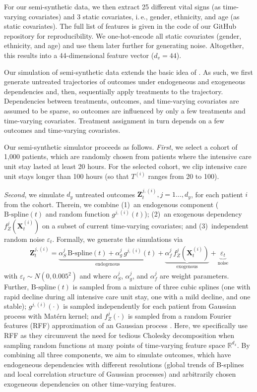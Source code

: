 \documentclass{article}
\newcommand\ie{i.\,e.\xspace}
\theoremstyle{plain}
\theoremstyle{definition}
\theoremstyle{remark}
\begin{document}
For our semi-synthetic data, we then extract 25 different vital signs (as time-varying covariates) and 3 static covariates, \ie, gender, ethnicity, and age (as static covariates). The full list of features is given in the code of our GitHub repository for reproducibility. We one-hot-encode all static covariates (gender, ethnicity, and age) and use them later further for generating noise. Altogether, this results into a 44-dimensional feature vector ($d_v = 44$).

Our simulation of semi-synthetic data extends the basic idea of \cite{schulam2017reliable}. As such, we first generate untreated trajectories of outcomes under endogeneous and exogeneous dependencies and, then, sequentially apply treatments to the trajectory. Dependencies between treatments, outcomes, and time-varying covariates are assumed to be sparse, so outcomes are influenced by only a few treatments and time-varying covariates. Treatment assignment in turn depends on a few outcomes and time-varying covariates. 

Our semi-synthetic simulator proceeds as follows. \emph{First}, we select a cohort of 1,000 patients, which are randomly chosen from patients where the intensive care unit stay lasted at least 20 hours. For the selected cohort, we clip intensive care unit stays longer than 100 hours (so that $T^{(i)}$ ranges from 20 to 100). 

\emph{Second}, we simulate $d_{y}$ untreated outcomes $\mathbf{Z}_{t}^{j, (i)}, j = 1 \dots, d_{y}$, for each patient $i$ from the cohort. Therein, we combine (1)~an endogenous component ($\text{B-spline}(t)$ and random function $g^{j, (i)}(t)$); (2)~an exogenous dependency $f_Z^j(\mathbf{X}_{t}^{(i)})$ on a subset of current time-varying covariates; and (3)~independent random noise $\varepsilon_t$. Formally, we generate the simulations via
\begin{align}
    \mathbf{Z}_{t}^{j, (i)} = \underbrace{\alpha_S^j \, \text{B-spline}(t) + \alpha_g^j \, g^{j, (i)}(t)}_\text{endogenous} +  \underbrace{\alpha_f^j \, f_Z^j(\mathbf{X}_{t}^{(i)})}_{\text{exogenous}} + \underbrace{\varepsilon_t}_{\text{noise}} 
\end{align}
with $\varepsilon_t \sim N(0, 0.005^2)$ and where $\alpha_S^j$, $\alpha_g^j$, and $\alpha_f^j$ are weight parameters. Further, $\text{B-spline}(t)$ is sampled from a mixture of three cubic splines (one with rapid decline during all intensive care unit stay, one with a mild decline, and one stable); $g^{j, (i)}(\cdot)$ is sampled independently for each patient from Gaussian process with Matérn kernel; and $f_Z^j(\cdot)$ is sampled from a random Fourier features (RFF) approximation of an Gaussian process \cite{hensman2017variational}. Here, we specifically use RFF as they circumvent the need for tedious Cholesky decomposition when sampling random functions at many points of time-varying feature space $\mathbb{R}^{d_x}$. By combining all three components, we aim to simulate outcomes, which have endogeneous dependencies with different resolutions (global trends of B-splines and local correlation structure of Gaussian processes) and arbitrarily chosen exogeneous dependencies on other time-varying features. 
\end{document}
